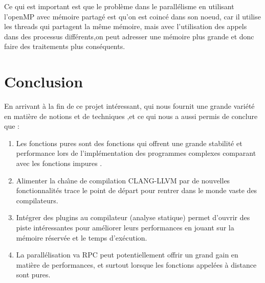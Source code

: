 \documentclass[12pt,a4paper]{article}
\begin{document}
Ce qui est important est que le problème dans le parallélisme en utilisant l'openMP avec mémoire partagé est qu'on est coincé dans son noeud, car il utilise les threads qui partagent la même mémoire, mais avec l'utilisation des appels dans des processus différents,on peut adresser une mémoire plus grande et donc faire des traitements plus conséquents.


\pagebreak

\section{Conclusion}


En arrivant à la fin de ce projet intéressant, qui nous fournit une grande variété en matière de notions et de techniques ,et ce qui nous a aussi permis de conclure que :

\begin{enumerate}
    \item Les fonctions pures sont des fonctions qui offrent une grande stabilité et performance lors de l'implémentation des programmes complexes comparant avec les fonctions impures .
    
    \item Alimenter la chaı̂ne de compilation CLANG-LLVM par de nouvelles fonctionnalités trace le point de départ pour rentrer dans le monde vaste des compilateurs.
    
    \item Intégrer des plugins au compilateur (analyse statique) permet d'ouvrir des piste intéressantes pour améliorer leurs performances en jouant sur la mémoire réservée et le temps d’exécution.
    
    \item La parallélisation va RPC peut potentiellement offrir un grand gain en matière de performances, et surtout lorsque les fonctions appelées à distance sont pures.
    
  \end{enumerate}  



\pagebreak 

\nocite{*} 



\end{document}
